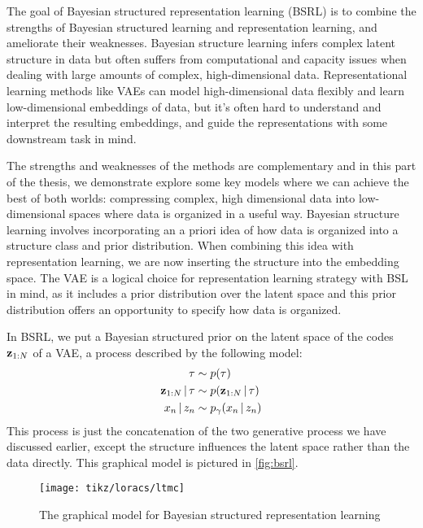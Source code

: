 The goal of Bayesian structured
representation learning (BSRL)
is to combine the
strengths of
Bayesian structured learning
and representation learning,
and ameliorate their weaknesses.
Bayesian structure learning
infers complex latent structure
in data but often suffers from
computational and capacity issues
when dealing with large amounts of
complex, high-dimensional data.
Representational learning methods
like VAEs can model high-dimensional
data flexibly and learn low-dimensional
embeddings of data,
but it's often hard to understand 
and interpret the resulting embeddings,
and guide the representations
with some downstream task in mind.

The strengths and weaknesses of
the methods are complementary
and in this part of the thesis, we demonstrate
explore some key models where we can
achieve the best of both worlds:
compressing complex, high dimensional
data into low-dimensional spaces
where data is organized in a useful way.
Bayesian structure learning
involves incorporating an a priori
idea of how data is organized
into a structure class and
prior distribution.
When combining this idea with representation
learning, we are now inserting
the structure into the embedding space.
The VAE is a logical choice
for representation learning strategy
with BSL in mind, as it includes
a prior distribution over the latent space
and this prior distribution
offers an opportunity to specify
how data is organized.

In BSRL, we put a Bayesian structured prior
on the latent space of the codes $\mathbf{z}_{1:N}$
of a VAE,
a process described by the following model:
\begin{align*}
    \tau &\sim p(\tau) \\
    \mathbf{z}_{1:N} \,|\, \tau &\sim p(\mathbf{z}_{1:N} \,|\, \tau) \\
    x_n \,|\, z_n &\sim p_\gamma(x_n \,|\, z_n)
\end{align*}
This process is just the concatenation
of the two generative process we have discussed earlier,
except the structure influences
the latent space rather than the data directly.
This graphical model is pictured in
\autoref{fig:bsrl}.

\begin{figure}[H]
    \centering
    \texttt{[image: tikz/loracs/ltmc]}
    \caption{The graphical model for
    Bayesian structured representation learning}
    \label{fig:bsrl}
\end{figure}

